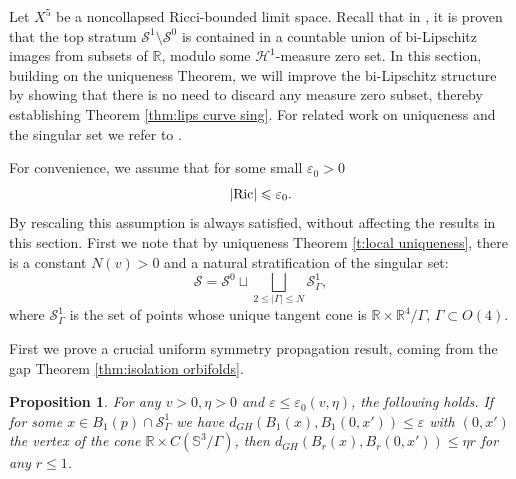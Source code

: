 \documentclass[11pt,reqno]{amsart}
\numberwithin{equation}{section}
\newcommand{\RR}{\mathds{R}}
\newcommand{\Ric}{{\rm Ric}}
\newcommand{\cH}{\mathcal{H}}
\newcommand{\cS}{\mathcal{S}}
\newtheorem{proposition}[thm]{Proposition}
\theoremstyle{definition}
\theoremstyle{remark}
\begin{document}
Let $X^5$ be a noncollapsed Ricci-bounded limit space. Recall that in \cite{cjn,jn}, it is proven that the top stratum $\cS^1 \setminus \cS^0$ is contained in a countable union of bi-Lipschitz images from subsets of $\RR$, modulo some $\cH^1$-measure zero set. In this section, building on the uniqueness Theorem, we will improve the bi-Lipschitz structure by showing that there is no need to discard any measure zero subset, thereby establishing Theorem \ref{thm:lips curve sing}. For related work on uniqueness and the singular set we refer to \cite{cm16,nv17,HJ23,HJ24, HJ25,flb,hkm}.


For convenience, we assume that for some small $\varepsilon_0>0$
\begin{equation}\label{e:Ric small}
    |\Ric| \leqslant \varepsilon_0.
\end{equation}
By rescaling this assumption is always satisfied, without affecting the results in this section. First we note that by uniqueness Theorem \ref{t:local uniqueness}, there is a constant $N(v)>0$ and a natural stratification of the singular set:
\begin{equation}\label{e:refined stratification}
    \cS = \cS^0 \sqcup \bigsqcup_{2 \leqslant |\Gamma| \leqslant N} \cS^1_{\Gamma}, 
\end{equation}
where $\cS_{\Gamma}^1$ is the set of points whose unique tangent cone is $\RR \times \RR^4/\Gamma$, $\Gamma\subset O(4)$.

First we prove a crucial uniform symmetry propagation result, coming from the gap Theorem \ref{thm:isolation orbifolds}. 

\begin{proposition}\label{p:uniform symmetry}
    For any $v>0, \eta>0$ and $\varepsilon \leqslant \varepsilon_0(v,\eta)$, the following holds. If for some $x \in B_1(p) \cap \cS^1_{\Gamma}$ we have $d_{GH}(B_1(x), B_1(0,x')) \leqslant \varepsilon$ with $(0,x')$ the vertex of the cone $\RR \times C(\mathbb{S}^3/\Gamma)$, then $d_{GH}(B_r(x), B_r(0,x')) \leqslant \eta r$ for any $r \leqslant 1$. 
\end{proposition}
\end{document}

